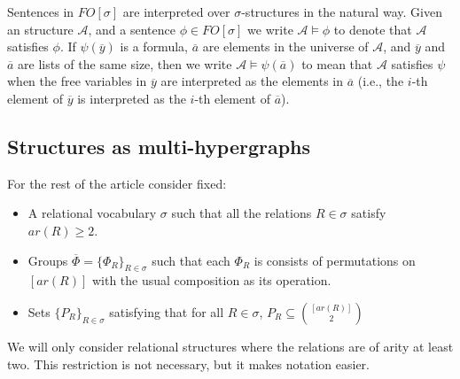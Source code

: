 \documentclass[12pt,notitlepage,a4paper]{article}
\theoremstyle{definition}
\begin{document}
Sentences in $FO[\sigma]$ are interpreted over $\sigma$-structures
in the natural way. Given an structure $\mathcal{A}$, and a sentence
$\phi\in FO[\sigma]$ we write $\mathcal{A} \models \phi$ to denote 
that $\mathcal{A}$ satisfies $\phi$. If $\psi(\overline{y})$ is a
formula, $\overline{a}$ are elements in the universe of 
$\mathcal{A}$, and $\overline{y}$ and $\overline{a}$ are lists of the same size,
then we write $\mathcal{A} \models 
\psi(\overline{a})$
to mean that $\mathcal{A}$ satisfies $\psi$ when the free variables in
$\overline{y}$ are interpreted as the elements in $\overline{a}$ (i.e., 
the $i$-th element of $\overline{y}$ is interpreted as the $i$-th
element of $\overline{a}$).


\subsection{Structures as multi-hypergraphs}

For the rest of the article consider fixed:
\begin{itemize}
	\item A relational vocabulary $\sigma$ such that all the relations $R\in\sigma$ satisfy $ar(R)\geq 2$. 
	\item 
	Groups $\overline{\Phi}=\{ \Phi_R \}_{R\in \sigma}$
	such that each $\Phi_R$ is consists of 
	permutations on $[ar(R)]$ with the usual 
	composition as its operation.	
	\item 
	Sets $\{P_R\}_{R\in \sigma}$ satisfying that for 
	all $R\in \sigma$, 
	$P_R\subseteq \binom{[ar(R)]}{2}$
	
	
\end{itemize}

We will only consider relational structures where the relations
are of arity at least two. This restriction is not necessary, but 
it makes notation easier. 



\end{document}
